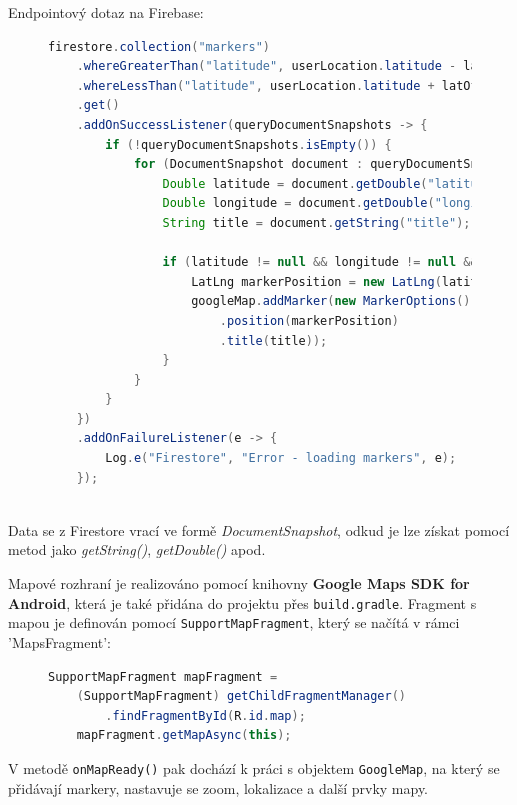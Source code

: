 Endpointový dotaz na Firebase:
\begin{figure}[H]
    \centering
    \begin{lstlisting}[language=Java, style=myJavastyle, caption={Endpoint - dotázání se na databázi}]
    firestore.collection("markers")
    .whereGreaterThan("latitude", userLocation.latitude - latOffset)
    .whereLessThan("latitude", userLocation.latitude + latOffset)
    .get()
    .addOnSuccessListener(queryDocumentSnapshots -> {
        if (!queryDocumentSnapshots.isEmpty()) {
            for (DocumentSnapshot document : queryDocumentSnapshots) {
                Double latitude = document.getDouble("latitude");
                Double longitude = document.getDouble("longitude");
                String title = document.getString("title");

                if (latitude != null && longitude != null && title != null) {
                    LatLng markerPosition = new LatLng(latitude, longitude);
                    googleMap.addMarker(new MarkerOptions()
                        .position(markerPosition)
                        .title(title));
                }
            }
        }
    })
    .addOnFailureListener(e -> {
        Log.e("Firestore", "Error - loading markers", e);
    });
    
    \end{lstlisting}
\end{figure}


Data se z Firestore vrací ve formě \textit{DocumentSnapshot}, odkud je lze získat pomocí metod jako \textit{getString()}, \textit{getDouble()} apod.

Mapové rozhraní je realizováno pomocí knihovny \textbf{Google Maps SDK for Android}, která je také přidána do projektu přes \texttt{build.gradle}. Fragment s mapou je definován pomocí \texttt{SupportMapFragment}, který se načítá v rámci 'MapsFragment':

\begin{figure}[H]
    \centering
    \begin{lstlisting}[language=Java, style=myJavastyle, caption={Načítání GoogleMaps Api - \texttt{SupportMapFragment}}]
    SupportMapFragment mapFragment = 
    (SupportMapFragment) getChildFragmentManager()
        .findFragmentById(R.id.map);
    mapFragment.getMapAsync(this);
    \end{lstlisting}
\end{figure}



V metodě \texttt{onMapReady()} pak dochází k práci s objektem \texttt{GoogleMap}, na který se přidávají markery, nastavuje se zoom, lokalizace a další prvky mapy.


